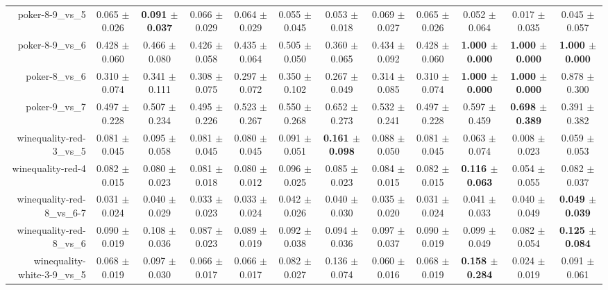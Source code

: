 \begin{table}[!ht]
{\begin{tabular}{r c c c c c c c c c c c}
poker-8-9\_vs\_5 & 0.065 $\pm$ 0.026 & \textbf{0.091 $\pm$ 0.037} & 0.066 $\pm$ 0.029 & 0.064 $\pm$ 0.029 & 0.055 $\pm$ 0.045 & 0.053 $\pm$ 0.018 & 0.069 $\pm$ 0.027 & 0.065 $\pm$ 0.026 & 0.052 $\pm$ 0.064 & 0.017 $\pm$ 0.035 & 0.045 $\pm$ 0.057 \\
poker-8-9\_vs\_6 & 0.428 $\pm$ 0.060 & 0.466 $\pm$ 0.080 & 0.426 $\pm$ 0.058 & 0.435 $\pm$ 0.064 & 0.505 $\pm$ 0.050 & 0.360 $\pm$ 0.065 & 0.434 $\pm$ 0.092 & 0.428 $\pm$ 0.060 & \textbf{1.000 $\pm$ 0.000} & \textbf{1.000 $\pm$ 0.000} & \textbf{1.000 $\pm$ 0.000} \\
poker-8\_vs\_6 & 0.310 $\pm$ 0.074 & 0.341 $\pm$ 0.111 & 0.308 $\pm$ 0.075 & 0.297 $\pm$ 0.072 & 0.350 $\pm$ 0.102 & 0.267 $\pm$ 0.049 & 0.314 $\pm$ 0.085 & 0.310 $\pm$ 0.074 & \textbf{1.000 $\pm$ 0.000} & \textbf{1.000 $\pm$ 0.000} & 0.878 $\pm$ 0.300 \\
poker-9\_vs\_7 & 0.497 $\pm$ 0.228 & 0.507 $\pm$ 0.234 & 0.495 $\pm$ 0.226 & 0.523 $\pm$ 0.267 & 0.550 $\pm$ 0.268 & 0.652 $\pm$ 0.273 & 0.532 $\pm$ 0.241 & 0.497 $\pm$ 0.228 & 0.597 $\pm$ 0.459 & \textbf{0.698 $\pm$ 0.389} & 0.391 $\pm$ 0.382 \\
winequality-red-3\_vs\_5 & 0.081 $\pm$ 0.045 & 0.095 $\pm$ 0.058 & 0.081 $\pm$ 0.045 & 0.080 $\pm$ 0.045 & 0.091 $\pm$ 0.051 & \textbf{0.161 $\pm$ 0.098} & 0.088 $\pm$ 0.050 & 0.081 $\pm$ 0.045 & 0.063 $\pm$ 0.074 & 0.008 $\pm$ 0.023 & 0.059 $\pm$ 0.053 \\
winequality-red-4 & 0.082 $\pm$ 0.015 & 0.080 $\pm$ 0.023 & 0.081 $\pm$ 0.018 & 0.080 $\pm$ 0.012 & 0.096 $\pm$ 0.025 & 0.085 $\pm$ 0.023 & 0.084 $\pm$ 0.015 & 0.082 $\pm$ 0.015 & \textbf{0.116 $\pm$ 0.063} & 0.054 $\pm$ 0.055 & 0.082 $\pm$ 0.037 \\
winequality-red-8\_vs\_6-7 & 0.031 $\pm$ 0.024 & 0.040 $\pm$ 0.029 & 0.033 $\pm$ 0.023 & 0.033 $\pm$ 0.024 & 0.042 $\pm$ 0.026 & 0.040 $\pm$ 0.030 & 0.035 $\pm$ 0.020 & 0.031 $\pm$ 0.024 & 0.041 $\pm$ 0.033 & 0.040 $\pm$ 0.049 & \textbf{0.049 $\pm$ 0.039} \\
winequality-red-8\_vs\_6 & 0.090 $\pm$ 0.019 & 0.108 $\pm$ 0.036 & 0.087 $\pm$ 0.023 & 0.089 $\pm$ 0.019 & 0.092 $\pm$ 0.038 & 0.094 $\pm$ 0.036 & 0.097 $\pm$ 0.037 & 0.090 $\pm$ 0.019 & 0.099 $\pm$ 0.049 & 0.082 $\pm$ 0.054 & \textbf{0.125 $\pm$ 0.084} \\
winequality-white-3-9\_vs\_5 & 0.068 $\pm$ 0.019 & 0.097 $\pm$ 0.030 & 0.066 $\pm$ 0.017 & 0.066 $\pm$ 0.017 & 0.082 $\pm$ 0.027 & 0.136 $\pm$ 0.074 & 0.060 $\pm$ 0.016 & 0.068 $\pm$ 0.019 & \textbf{0.158 $\pm$ 0.284} & 0.024 $\pm$ 0.019 & 0.091 $\pm$ 0.061 \\

\end{tabular}}
\end{table}
